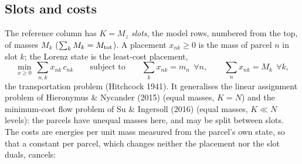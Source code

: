 \documentclass[11pt,a4paper]{article}
\newcommand{\Mtot}{M_{\rm tot}}
\begin{document}
\subsection{Slots and costs}\label{sec:slots}
The reference column has $K=M_z$ \emph{slots}, the model rows, numbered from the top, of masses $M_k$ ($\sum_kM_k=\Mtot$). A
placement $x_{nk}\ge0$ is the mass of parcel $n$ in slot $k$; the Lorenz state is the least-cost placement,
\begin{equation}
  \min_{x\ge0}\ \sum_{n,k}x_{nk}\,c_{nk}\qquad\text{subject to}\qquad \sum_kx_{nk}=m_n\ \ \forall n,\qquad \sum_nx_{nk}=M_k\ \ \forall k ,
  \label{eq:tp}
\end{equation}
the transportation problem (Hitchcock 1941). It generalises the linear assignment problem of Hieronymus \& Nycander (2015)
(equal masses, $K=N$) and the minimum-cost flow problem of Su \& Ingersoll (2016) (equal masses, $K\ll N$ levels): the
parcels have unequal masses here, and may be split between slots. The costs are energies per unit mass measured from the
parcel's own state, so that a constant per parcel, which changes neither the placement nor the slot duals, cancels:
\end{document}
